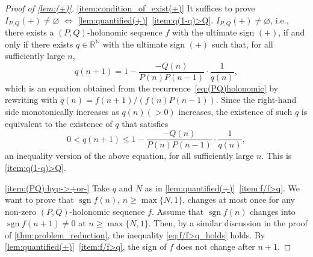 \documentclass[a4paper,UKenglish,cleveref,autoref,thm-restate]{lipics-v2021}
\newcommand{\R}{\mathbb{R}}
\newcommand{\N}{\mathbb{N}}
\DeclareMathOperator{\sgn}{sgn}
\begin{document}
\begin{proof}[Proof of \cref{lem:(+)}]
\eqref{item:condition_of_exist(+)} It suffices to prove $I_{P, Q}(+) \neq \varnothing$ $\iff$ \cref{lem:quantified(+)}~\eqref{item:q(1-q)>Q}. 
$I_{P, Q}(+) \neq \varnothing$, i.e., there exists a $(P, Q)$-holonomic sequence $f$ with the ultimate sign $(+)$, if and only if there exists $q \in \R^{\N}$ with the ultimate sign $(+)$ such that, for all sufficiently large $n$,
\[
 q (n + 1) = 1 - \frac{-Q (n)}{P (n) P (n - 1)} \cdot \frac{1}{q (n)}, 
\]
which is an equation obtained from the recurrence~\eqref{eq:(PQ)holonomic} by rewriting with $q (n) = f (n + 1) / (f (n)P (n - 1))$. 
Since the right-hand side monotonically increases as $q(n) (> 0)$ increases, the existence of such $q$ is equivalent to the existence of $q$ that satisfies 
\[
 0 < q (n + 1) \leq 1 - \frac{-Q (n)}{P (n) P (n - 1)} \cdot \frac{1}{q (n)}, 
\]
an inequality version of the above equation, for all sufficiently large $n$. This is \eqref{item:q(1-q)>Q}. 

\eqref{item:(PQ):hyp->+or-} Take $q$ and $N$ as in \cref{lem:quantified(+)}~\eqref{item:f/f>q}. We want to prove that $\sgn f(n)$, $n \geq \max \{ N, 1 \}$, changes at most once for any non-zero $(P, Q)$-holonomic sequence $f$. Assume that $\sgn f(n)$ changes into $\sgn f(n+1) \neq 0$ at $n \geq \max \{ N, 1 \}$. Then, by a similar discussion in the proof of \cref{thm:problem_reduction}, the inequality \eqref{eq:f/f>q_holds} holds. 
By \cref{lem:quantified(+)}~\eqref{item:f/f>q}, the sign of $f$ does not change after $n+1$. 
\end{proof}
\end{document}
